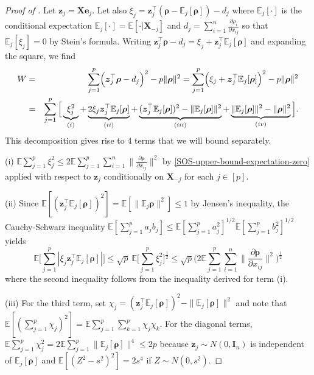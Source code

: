 \documentclass[11pt]{amsart}
\numberwithin{equation}{section}
\numberwithin{equation}{section}
\newcommand{\bes}{\begin{eqnarray*}}
\newcommand{\ees}{\end{eqnarray*}}
\def\E{{\mathbb{E}}}
\def\mathbold{\boldsymbol} %
\def\bI{\mathbold{I}}\def\hbI{{\widehat{\bI}}}\def\tbI{{\widetilde{\bI}}}
\def\be{\mathbold{e}}
\def\bX{\mathbold{X}}\def\hbX{{\widehat{\bX}}}\def\tbX{{\widetilde{\bX}}}\def\bXbar{{\overline \bX}}
\def\bz{\mathbold{z}}\def\zhat{\widehat{z}}\def\ztil{\widetilde{z}}\def\zbar{{\overline z}}
\def\brho{\mathbold{\rho}}\def\rhohat{\widehat{\rho}}\def\hrho{\widehat{\rho}}
\begin{document}
\thmChiSquare
\begin{proof}[Proof of ]
    Let $\bz_j = \bX\be_j$. Let also
    $\xi_j = \bz_j^\top(\brho-\E_j[\brho]) - d_j $
    where $\E_j[\cdot]$ is the conditional expectation
    $\E_j[\cdot] = \E[\cdot|\bX_{-j}]$
    and $d_j = \sum_{i=1}^n \frac{\partial \rho_i}{\partial x_{ij}}$
    so that $\E_j[\xi_j] = 0$ by Stein's formula.
    Writing $\bz_j^\top \brho - d_j = \xi_j + \bz_j^\top\E_j[\brho]$
    and expanding the square, we find
    \bes
    W & 
    =
      & \sum_{j=1}^p\Bigl(\bz_j^\top \brho - d_j\Bigr)^2
    - p\|\brho\|^2
    =
        \sum_{j=1}^p\Bigl(\xi_j + \bz_j^\top\E_j[\brho]\Bigr)^2
    - p\|\brho\|^2
    \\&=&
  \sum_{j=1}^p
  \Big[
      \underbrace{\xi_j^2}_{(i)} 
      + \underbrace{2\xi_j \bz_j^\top\E_j[\brho]}_{(ii)}
      +\underbrace{(\bz_j^\top\E_j[\brho])^2 -\|\E_j[\brho]\|^2}_{(iii)}
      + \underbrace{\|\E_j[\brho]\|^2 -  \|\brho\|^2}_{(iv)}
  \Big].
    \ees
    This decomposition gives rise to 4 terms that we will bound separately.

    (i) $\E \sum_{j=1}^p \xi_j^2  \le 2\E \sum_{j=1}^p \sum_{i=1}^n \|\frac{\partial \brho}{\partial x_{ij}}\|^2$ by \eqref{SOS-upper-bound-expectation-zero}
    applied with respect to $\bz_j$ conditionally on $\bX_{-j}$
    for each $j\in[p]$.

    (ii)
    Since 
    $\E[(\bz_j^\top\E_j[\brho])^2]=\E[\|\E_j\brho\|^2]\le1$ by Jensen's inequality,
    the Cauchy-Schwarz inequality $\E[\sum_{j=1}^p a_j b_j]
    \le
    \E[\sum_{j=1}^p a_j^2]^{1/2}
    \E[\sum_{j=1}^p b_j^2]^{1/2}
    $
    yields
    $$\E\Big[\sum_{j=1}^p|\xi_j \bz_j^\top\E_j[\brho]|\Big]
    \le
    \sqrt p
    ~
    \E\Big[\sum_{j=1}^p\xi_j^2\Big]^{\frac12}
    \le
    \sqrt p
    \Big(2 \E \sum_{j=1}^p \sum_{i=1}^n \|\frac{\partial \brho}{\partial x_{ij}}\|^2
    \Big)^{\frac12}
    $$
    where the second inequality follows from the inequality
    derived for term (i).

    (iii)
    For the third term, set 
    $\chi_j = (\bz_j^\top\E_j[\brho])^2 -\|\E_j[\brho]\|^2$
    and note that
    $\E [ ( \sum_{j=1}^p \chi_j)^2 ]
  =\E\sum_{j=1}^p
\sum_{k=1}^p
    \chi_j \chi_k
    $.
    For the diagonal terms,
    $\E\sum_{j=1}^p \chi_j^2 = 
    2 \E\sum_{j=1}^p \|\E_j[\brho]\|^4
    \le 2p
    $
    because $\bz_j\sim N(0,\bI_n)$ is independent of $\E_j[\brho]$ and
    $\E[(Z^2-s^2)^2]= 2 s^4$ if $Z\sim N(0,s^2)$.


\end{proof}
\end{document}
